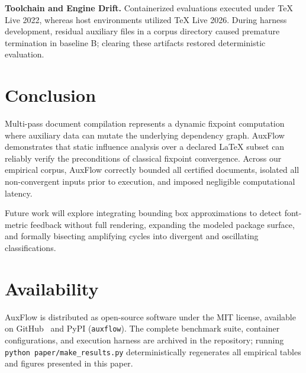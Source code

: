 \documentclass[conference]{IEEEtran}
\begin{document}
\textbf{Toolchain and Engine Drift.}
Containerized evaluations executed under TeX Live 2022, whereas host environments utilized TeX Live 2026. During harness development, residual auxiliary files in a corpus directory caused premature termination in baseline B; clearing these artifacts restored deterministic evaluation.

\section{Conclusion}

Multi-pass document compilation represents a dynamic fixpoint computation where auxiliary data can mutate the underlying dependency graph. AuxFlow demonstrates that static influence analysis over a declared \LaTeX{} subset can reliably verify the preconditions of classical fixpoint convergence. Across our empirical corpus, AuxFlow correctly bounded all certified documents, isolated all non-convergent inputs prior to execution, and imposed negligible computational latency.

Future work will explore integrating bounding box approximations to detect font-metric feedback without full rendering, expanding the modeled package surface, and formally bisecting amplifying cycles into divergent and oscillating classifications.

\section*{Availability}

AuxFlow is distributed as open-source software under the MIT license, available on GitHub~\cite{auxflow} and PyPI (\texttt{auxflow}). The complete benchmark suite, container configurations, and execution harness are archived in the repository; running \texttt{python paper/make\_results.py} deterministically regenerates all empirical tables and figures presented in this paper.



\end{document}
